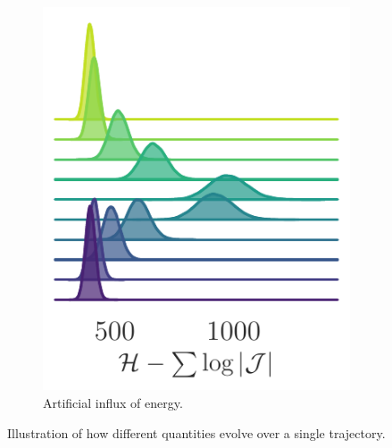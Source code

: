 \documentclass[a4paper,11pt]{article}
\begin{document}
\begin{figure}[htpb]
\begin{subfigure}[t]{0.318\textwidth}
        \includegraphics[width=\textwidth]{assets/ridgeplots/hwf.pdf}
        \caption{\label{fig:hwf_ridgeplot}Artificial influx of energy.}
    \end{subfigure}
    \caption{\label{fig:ridgeplots}Illustration of how different quantities
    evolve over a single trajectory.}%
\end{figure}
%
\end{document}
